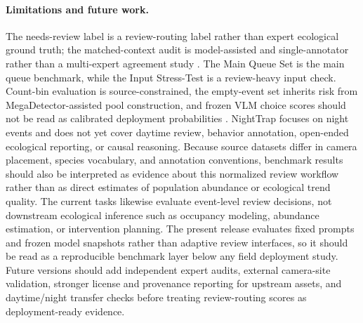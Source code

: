 \documentclass{article}
\begin{document}
\paragraph{Limitations and future work.}
The needs-review label is a review-routing label rather than expert ecological ground truth; the matched-context audit is model-assisted and single-annotator rather than a multi-expert agreement study \citep{northcutt2021labelerrors}. The Main Queue Set is the main queue benchmark, while the Input Stress-Test is a review-heavy input check. Count-bin evaluation is source-constrained, the empty-event set inherits risk from MegaDetector-assisted pool construction, and frozen VLM choice scores should not be read as calibrated deployment probabilities \citep{guo2017calibration}. NightTrap focuses on night events and does not yet cover daytime review, behavior annotation, open-ended ecological reporting, or causal reasoning. Because source datasets differ in camera placement, species vocabulary, and annotation conventions, benchmark results should also be interpreted as evidence about this normalized review workflow rather than as direct estimates of population abundance or ecological trend quality. The current tasks likewise evaluate event-level review decisions, not downstream ecological inference such as occupancy modeling, abundance estimation, or intervention planning. The present release evaluates fixed prompts and frozen model snapshots rather than adaptive review interfaces, so it should be read as a reproducible benchmark layer below any field deployment study. Future versions should add independent expert audits, external camera-site validation, stronger license and provenance reporting for upstream assets, and daytime/night transfer checks before treating review-routing scores as deployment-ready evidence.
\end{document}
